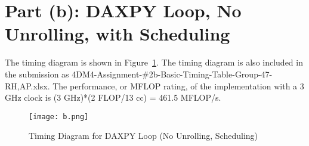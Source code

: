 \section*{Part (b): DAXPY Loop, No Unrolling, with Scheduling}
The timing diagram is shown in Figure~\ref{fig:b}. The timing diagram is also included in the submission as 4DM4-Assignment-\#2b-Basic-Timing-Table-Group-47-RH,AP.xlsx. The performance, or MFLOP rating, of the implementation with a 3 GHz clock is (3 GHz)*(2 FLOP/13 cc) = 461.5 MFLOP/s.

\begin{figure}[htp]
\centering
\caption{Timing Diagram for DAXPY Loop (No Unrolling, Scheduling)}
\texttt{[image: b.png]}
\label{fig:b}
\end{figure}